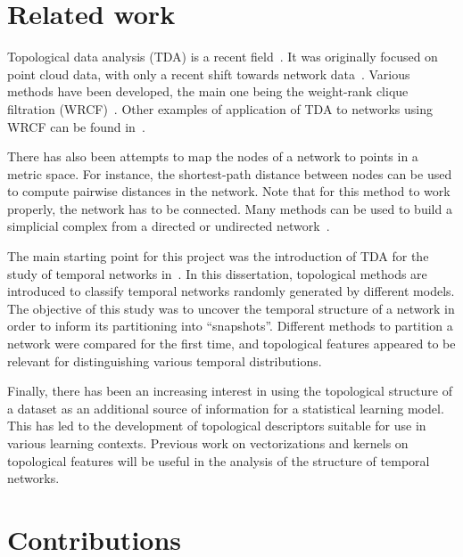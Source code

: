 \documentclass[a4paper,11pt,openany,extrafontsizes]{memoir}
\begin{document}
\section{Related work}%
\label{sec:related-work}

Topological data analysis (TDA) is a recent
field~\cite{carlsson_topology_2009}. It was originally focused on
point cloud data, with only a recent shift towards network
data~\cite{horak_persistent_2009}. Various methods have been
developed, the main one being the weight-rank clique filtration
(WRCF)~\cite{petri_topological_2013}. Other examples of application of
TDA to networks using WRCF can be found in~\cite{otter_roadmap_2017}.

There has also been attempts to map the nodes of a network to points
in a metric space. For instance, the shortest-path distance between
nodes can be used to compute pairwise distances in the network. Note
that for this method to work properly, the network has to be
connected. Many methods can be used to build a simplicial complex from
a directed or undirected network~\cite{jonsson_simplicial_2008,
  horak_persistent_2009}.

The main starting point for this project was the introduction of TDA
for the study of temporal networks
in~\cite{price-wright_topological_2015}. In this dissertation,
topological methods are introduced to classify temporal networks
randomly generated by different models. The objective of this study
was to uncover the temporal structure of a network in order to inform
its partitioning into ``snapshots''. Different methods to partition a
network were compared for the first time, and topological features
appeared to be relevant for distinguishing various temporal
distributions.

Finally, there has been an increasing interest in using the
topological structure of a dataset as an additional source of
information for a statistical learning model. This has led to the
development of topological descriptors suitable for use in various
learning contexts. Previous work on vectorizations and kernels on
topological features will be useful in the analysis of the structure
of temporal networks.

\section{Contributions}%
\label{sec:contributions}
\end{document}
